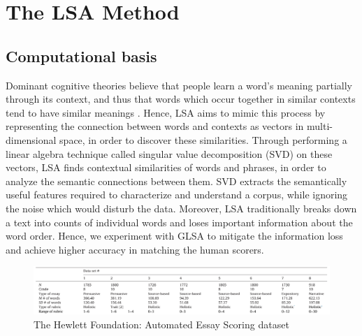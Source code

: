 \documentclass[10pt,letterpaper]{article}
\begin{document}


\section{The LSA Method}

\subsection{Computational basis}

Dominant cognitive theories believe that people learn a word's meaning partially through its context, and thus that words which occur together in similar contexts tend to have similar meanings \cite{kintsch2002potential}. Hence, LSA aims to mimic this process by representing the connection between words and contexts as vectors in multi-dimensional space, in order to discover these similarities. Through performing a linear algebra technique called singular value decomposition (SVD) on these vectors, LSA finds contextual similarities of words and phrases, in order to analyze the semantic connections between them. SVD extracts the semantically useful features required to characterize and understand a corpus, while ignoring the noise which would disturb the data. Moreover, LSA traditionally breaks down a text into counts of individual words and loses important information about the word order. Hence, we experiment with GLSA to mitigate the information loss and achieve higher accuracy in matching the human scorers.

\begin{figure}[ht]
\begin{center}
\includegraphics[width=\linewidth]{img/DatasetArray.png}
\end{center}
\caption{The Hewlett Foundation: Automated Essay Scoring dataset \cite{shermis2014state}}
\end{figure}
\end{document}

